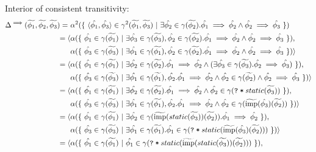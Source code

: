 \documentclass[11pt,a4paper]{article}
\begin{document}
Interior of consistent transitivity:
\begin{align*}
\Delta^{\implies}(\grad{\phi_1}, \grad{\phi_2}, \grad{\phi_3})
=~&\alpha^2(\{~ \langle \hat{\phi_1}, \hat{\phi_3} \rangle \in \gamma^2(\grad{\phi_1}, \grad{\phi_3}) ~|~ \exists \hat{\phi_2} \in \gamma(\grad{\phi_2}). \hat{\phi_1} \implies \hat{\phi_2} \wedge \hat{\phi_2} \implies \hat{\phi_3} ~\}) \\
= \langle 
&\alpha(\{~ \hat{\phi_1} \in \gamma(\grad{\phi_1}) ~|~ \exists \hat{\phi_3} \in \gamma(\grad{\phi_3}), \hat{\phi_2} \in \gamma(\grad{\phi_2}). \hat{\phi_1} \implies \hat{\phi_2} \wedge \hat{\phi_2} \implies \hat{\phi_3} ~\}),\\
&\alpha(\{~ \hat{\phi_3} \in \gamma(\grad{\phi_3}) ~|~ \exists \hat{\phi_1} \in \gamma(\grad{\phi_1}), \hat{\phi_2} \in \gamma(\grad{\phi_2}). \hat{\phi_1} \implies \hat{\phi_2} \wedge \hat{\phi_2} \implies \hat{\phi_3} ~\})
\rangle\\
= \langle 
&\alpha(\{~ \hat{\phi_1} \in \gamma(\grad{\phi_1}) ~|~ \exists \hat{\phi_2} \in \gamma(\grad{\phi_2}). \hat{\phi_1} \implies \hat{\phi_2} \wedge (\exists \hat{\phi_3} \in \gamma(\grad{\phi_3}). \hat{\phi_2} \implies \hat{\phi_3}) ~\}),\\
&\alpha(\{~ \hat{\phi_3} \in \gamma(\grad{\phi_3}) ~|~ \exists \hat{\phi_1} \in \gamma(\grad{\phi_1}), \hat{\phi_2}. \hat{\phi_1} \implies \hat{\phi_2} \wedge \hat{\phi_2} \in \gamma(\grad{\phi_2}) \wedge \hat{\phi_2} \implies \hat{\phi_3} ~\})
\rangle\\
= \langle 
&\alpha(\{~ \hat{\phi_1} \in \gamma(\grad{\phi_1}) ~|~ \exists \hat{\phi_2} \in \gamma(\grad{\phi_2}). \hat{\phi_1} \implies \hat{\phi_2} \wedge \hat{\phi_2} \in \gamma(\withqm{static(\grad{\phi_3})}) ~\}),\\
&\alpha(\{~ \hat{\phi_3} \in \gamma(\grad{\phi_3}) ~|~ \exists \hat{\phi_1} \in \gamma(\grad{\phi_1}), \hat{\phi_2}. \hat{\phi_1} \implies \hat{\phi_2} \wedge \hat{\phi_2} \in \gamma(\grad{\imp}(\hat{\phi_3})(\grad{\phi_2})) ~\})
\rangle\\
= \langle 
&\alpha(\{~ \hat{\phi_1} \in \gamma(\grad{\phi_1}) ~|~ \exists \hat{\phi_2} \in \gamma(\grad{\imp}(static(\grad{\phi_3}))(\grad{\phi_2})). \hat{\phi_1} \implies \hat{\phi_2} ~\}),\\
&\alpha(\{~ \hat{\phi_3} \in \gamma(\grad{\phi_3}) ~|~ \exists \hat{\phi_1} \in \gamma(\grad{\phi_1}). \hat{\phi_1} \in \gamma(\withqm{static(\grad{\imp}(\hat{\phi_3})(\grad{\phi_2}))}) ~\})
\rangle\\
= \langle 
&\alpha(\{~ \hat{\phi_1} \in \gamma(\grad{\phi_1}) ~|~ \hat{\phi_1} \in \gamma(\withqm{static(\grad{\imp}(static(\grad{\phi_3}))(\grad{\phi_2}))}) ~\}),\\

\end{align*}
\end{document}
